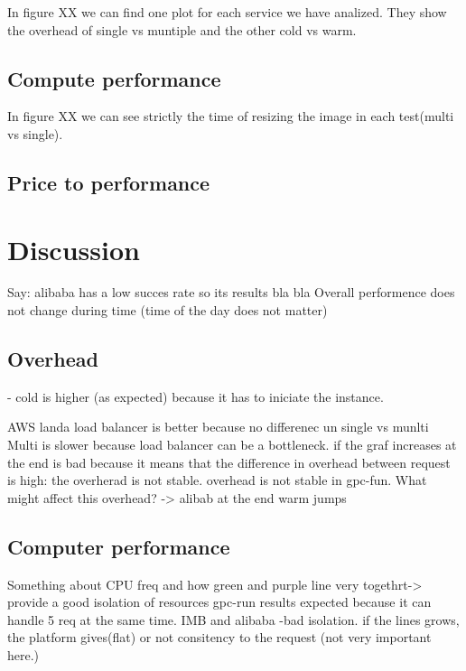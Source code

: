 \documentclass[11pt]{article}
\begin{document}
In figure XX we can find one plot for each service we have analized. They show the overhead of single vs muntiple and the other cold vs warm. 



\subsection{Compute performance}

In figure XX we can see strictly the time of resizing the image in each test(multi vs single). 


\subsection{Price to performance}



\section{Discussion}
Say: alibaba has a low succes rate so its results bla bla
Overall performence does not change during time (time of the day does not matter)

\subsection{Overhead}
- cold is higher (as expected) because it has to iniciate the instance. 


AWS landa load balancer is better because no differenec un single vs munlti
Multi is slower because load balancer can be a bottleneck.
if the graf increases at the end is bad because it means that the difference in overhead between request is high: the overherad is not stable. overhead is not stable in gpc-fun.
What might affect this overhead? -> 
alibab at the end warm jumps  


\subsection{Computer performance}
Something about CPU freq and how 
green and purple line very togethrt-> provide a good isolation of resources
gpc-run results expected because it can handle 5 req at the same time. 
IMB and alibaba -bad isolation.
if the lines grows, the platform gives(flat) or not consitency to the request (not very important here.)
\end{document}
